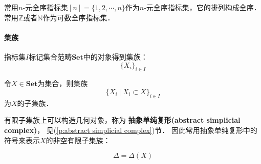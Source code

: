 \begin{example}
    常用$n$-元全序指标集$[n] = \{1,2,\cdots,n\}$作为$n$-元全序指标集，它的排列构成全序．
    常用$\mathbb Z$或者$\mathbb N$作为可数全序指标集．
\end{example}

\paragraph{集族}

指标集$I$标记集合范畴$\textbf{Set}$中的对象得到集族：
$$
\{X_i\}_{i\in I}
$$

令$X\in\textbf{Set}$为集合，则集族
$$
\{X_i \ | \ X_i \subset X \}_{i\in I}
$$
为$X$的子集族．    

有限子集族上可以构造几何对象，称为
\textbf{抽象单纯复形(abstract simplicial complex)}，
见(\ref{p:abstract simplicial complex})节．
因此常用抽象单纯复形中的符号来表示$X$的非空有限子集族：

$$
\Delta = \Delta(X)
$$


